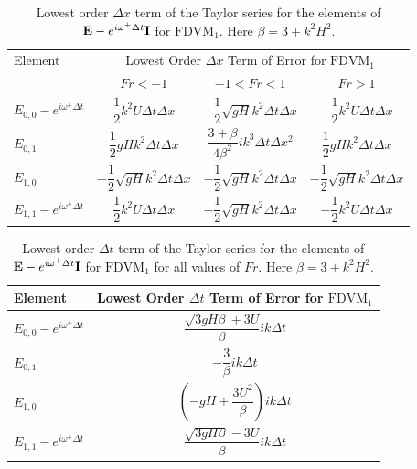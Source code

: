 \begin{table}
	\begin{tabular}{l c c c}
        \hline
		Element & \multicolumn{3}{c}{Lowest Order $\Delta x$ Term of Error for $\text{FDVM}_1$} \T \B \\ 
		\cline{2-4}
		& $Fr < -1$  & $-1 < Fr < 1$ & $Fr > 1$ \T \B \\ 
		\hline
		$E_{0,0} -  e^{i \omega^+ \Delta t} $& $ \dfrac{1}{2} k^2 U \Delta t \Delta x$& $ - \dfrac{1}{2} \sqrt{gH} k^2 \Delta t\Delta x$ &  $- \dfrac{1}{2} k^2 U \Delta t \Delta x$  \T \B \\
		$E_{0,1}$& $\dfrac{1}{2}gHk^2 \Delta t \Delta x $  &$ \dfrac{3 + \beta}{4 \beta^2}i k^3\Delta  t\Delta x^2$ & $\dfrac{1}{2}gHk^2 \Delta t \Delta x $ \T \B   \\
		$E_{1,0}$& $ - \dfrac{1}{2} \sqrt{gH} k^2 \Delta t\Delta x$  &$ - \dfrac{1}{2} \sqrt{gH} k^2 \Delta t\Delta x$ & $ - \dfrac{1}{2} \sqrt{gH} k^2 \Delta t\Delta x$ \T \B  \\
		$E_{1,1} -  e^{i \omega^+ \Delta t}$& $ \dfrac{1}{2} k^2 U \Delta t \Delta x$  &$ - \dfrac{1}{2} \sqrt{gH} k^2 \Delta t\Delta x$ & $- \dfrac{1}{2} k^2 U \Delta t \Delta x$  \T\B  \\
		\hline
	\end{tabular}
	\caption{Lowest order $\Delta x$ term of the Taylor series for the elements of $\mathbf{E} - e^{i \omega^+ \Delta t} \mathbf{I}$ for $\text{FDVM}_1$. Here $\beta = 3 + k^2 H^2$.}
	\label{tab:EerrFDVM1dxerror} 
\end{table}
\begin{table}
	\begin{tabular}{l c}
		\hline 
		Element & \multicolumn{1}{c}{Lowest Order $\Delta t$ Term of Error for $\text{FDVM}_1$}\T\B \\
		\hline 
		$E_{0,0} -  e^{i \omega^+ \Delta t} $ & $\dfrac{\sqrt{3gH \beta} + 3U}{\beta} ik \Delta t$ \T \B \\
		$E_{0,1}$&  $ - \dfrac{3}{\beta} ik\Delta t$ \T \B \\
		$E_{1,0}$&   $ \left(-gH + \dfrac{3U^2}{\beta}\right)ik \Delta t$ \T \B  \\
		$E_{1,1} -  e^{i \omega^+ \Delta t}$& $\dfrac{\sqrt{3gH \beta} - 3U}{\beta} ik \Delta t$ \T \B  \\
		\hline
	\end{tabular}
	\caption{Lowest order $\Delta t$ term of the Taylor series for the elements of $\mathbf{E} - e^{i \omega^+ \Delta t} \mathbf{I}$ for $\text{FDVM}_1$ for all values of $Fr$. Here $\beta = 3 + k^2 H^2$.}
	\label{tab:EerrFDVM1dterror} 
\end{table}
